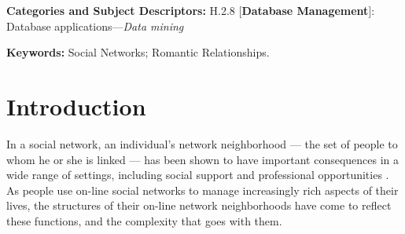 \documentclass{sigchi}
\newcommand{\omt}[1]{}
\newcommand\blfootnote[1]{%
  \begingroup
  \renewcommand\thefootnote{}\footnote{#1}%
  \addtocounter{footnote}{-1}%
  \endgroup
}
\begin{document}
\vspace{0.05in}
\noindent
{\bf Categories and Subject Descriptors:}
H.2.8 [{\bf Database Management}]: Database applications---{\em Data mining}

\vspace{0.0in}
\noindent
{\bf Keywords:}
Social Networks; Romantic Relationships.
\vspace{0.0in}

% 
% 
% 
% 

% 

\section{Introduction}

In a social network, 
an individual's network neighborhood ---
the set of people to whom he or she is linked ---
has been shown to have important consequences in a wide range of
settings, including social support
\cite{fischer-dwell-book,mcpherson-impt-matters}
and professional opportunities
\cite{granovetter-weak-ties,burt-struct-holes-book}.
As people use on-line social networks to manage increasingly
rich aspects of their lives, the structures of their on-line
network neighborhoods have come to reflect these functions, and
the complexity that goes with them.
\end{document}
